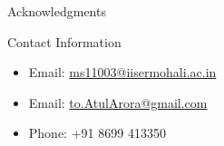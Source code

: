 \documentclass[final,hyperref={pdfpagelabels=false}]{beamer}
\begin{document}
\begin{frame}[t]
\begin{columns}[c]
\begin{column}{.32\textwidth}

  \begin{block}{Acknowledgments}


  \end{block}



  \begin{block}{Contact Information}

    \begin{itemize}
    \item Email: \href{mailto:ms11003@iisermohali.ac.in}{ms11003@iisermohali.ac.in}
    \item Email: \href{mailto:to.AtulArora@gmail.com}{to.AtulArora@gmail.com}
    \item Phone: +91 8699 413350
    \end{itemize}

  \end{block}


\end{column} %

\begin{column}{.015\textwidth}\end{column} %

\end{columns} %


\end{frame} %
\end{document}

